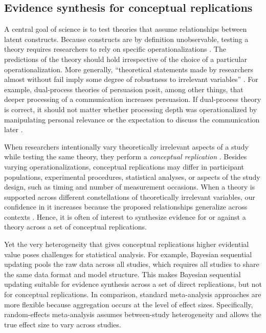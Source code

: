 \documentclass[letterpaper,11pt,oneside]{article}
\begin{document}
\subsection{Evidence synthesis for conceptual replications}

A central goal of science is to test theories that assume relationships between latent constructs. Because constructs are by definition unobservable, testing a theory requires researchers to rely on specific operationalizations \parencite{stroebeAllegedCrisisIllusion2014}. The predictions of the theory should hold irrespective of the choice of a particular operationalization. More generally, ``theoretical statements made by researchers almost without fail imply some degree of robustness to irrelevant variables'' \parencite[p. 2608]{baribaultMetastudiesRobustTests2018}. For example, dual-process theories of persuasion \parencite{chaikenHeuristicSystematicInformation1980} posit, among other things, that deeper processing of a communication increases persuasion. If dual-process theory is correct, it should not matter whether processing depth was operationalized by manipulating personal relevance \parencite{pettyPersonalInvolvementDeterminant1981} or the expectation to discuss the communication later \parencite{chaikenHeuristicSystematicInformation1980}. 

When researchers intentionally vary theoretically irrelevant aspects of a study while testing the same theory, they perform a \emph{conceptual replication} \parencite{schmidtShallWeReally2009}. Besides varying operationalizations, conceptual replications may differ in participant populations, experimental procedures, statistical analyses, or aspects of the study design, such as timing and number of measurement occasions. When a theory is supported across different constellations of theoretically irrelevant variables, our confidence in it increases because the proposed relationships generalize across contexts \parencite{schmidtShallWeReally2009, stroebeAllegedCrisisIllusion2014, lakensImprovingYourStatistical2022}. Hence, it is often of interest to synthesize evidence for or against a theory across a set of conceptual replications.

Yet the very heterogeneity that gives conceptual replications higher evidential value poses challenges for statistical analysis. For example, Bayesian sequential updating \parencite{schonbrodtSequentialHypothesisTesting2017} pools the raw data across all studies, which requires all studies to share the same data format and model structure. This makes Bayesian sequential updating suitable for evidence synthesis across a set of direct replications, but not for conceptual replications. In comparison, standard meta-analysis approaches are more flexible because aggregation occurs at the level of effect sizes. Specifically, random-effects meta-analysis assumes between-study heterogeneity and allows the true effect size to vary across studies.
\end{document}
